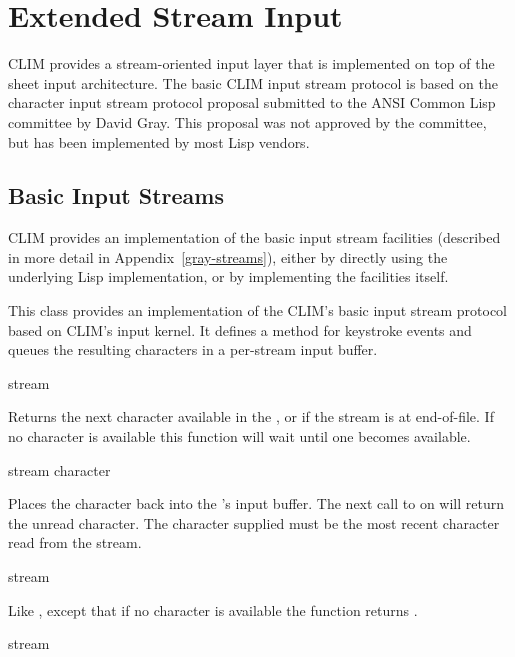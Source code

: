 
\chapter {Extended Stream Input}
\label {extended-input}

CLIM provides a stream-oriented input layer that is implemented on top of the
sheet input architecture.  The basic CLIM input stream protocol is based on the
character input stream protocol proposal submitted to the ANSI Common Lisp
committee by David Gray.  This proposal was not approved by the committee, but
has been implemented by most Lisp vendors.

\section {Basic Input Streams}

CLIM provides an implementation of the basic input stream facilities (described
in more detail in Appendix~\ref{gray-streams}), either by directly using the
underlying Lisp implementation, or by implementing the facilities itself.


This class provides an implementation of the CLIM's basic input stream protocol
based on CLIM's input kernel.  It defines a  method for
keystroke events and queues the resulting characters in a per-stream input
buffer.
\Mutable

 {stream}

Returns the next character available in the  , or
 if the stream is at end-of-file.  If no character is available this
function will wait until one becomes available.

 {stream character}

Places the character  back into the 
's input buffer.  The next call to  on 
will return the unread character.  The character supplied must be the most
recent character read from the stream.

 {stream}

Like , except that if no character is available the
function returns .

 {stream}

